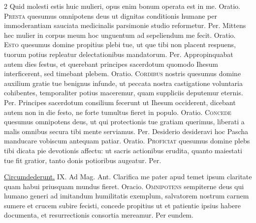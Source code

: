 \begin{multicols*}{2}
 Quid molesti estis huic mulieri, opus enim bonum operata est in me. {\color{Red} Oratio.}
\lettrine[lines=2]{\zallmancaps \color{Red} P}{resta} quesumus omnipotens deus ut dignitas conditionis humane per immoderantiam sauciata medicinalis parsimonie studio reformetur. Per.
 Mittens hec mulier in corpus meum hoc unguentum ad sepeliendum me fecit. {\color{Red} Oratio.}
\lettrine[lines=2]{\zallmancaps \color{Blue} E}{sto} quesumus domine propitius plebi tue, ut que tibi non placent respuens, tuorum potius repleatur delectationibus mandatorum. Per.
 Appropinquabat autem dies festus, et querebant principes sacerdotum quomodo Ihesum interficerent, sed timebant plebem. {\color{Red} Oratio.}
\lettrine[lines=2]{\zallmancaps \color{Red} C}{ordibus} nostris quesumus domine auxilium gratie tue benignus infunde, ut peccata nostra castigatione voluntaria cohibentes, temporaliter potius maceremur, quam suppliciis deputemur eternis. Per.
 Principes sacerdotum consilium fecerunt ut Ihesum occiderent, dicebant autem non in die festo, ne forte tumultus fieret in populo. {\color{Red} Oratio.}
\lettrine[lines=2]{\zallmancaps \color{Blue} C}{oncede} quesumus omnipotens deus, ut qui protectionis tue gratiam querimus, liberati a malis omnibus secura tibi mente serviamus. Per.
 Desiderio desideravi hoc Pascha manducare vobiscum antequam patiar. {\color{Red} Oratio.}
\lettrine[lines=2]{\zallmancaps \color{Red} P}{roficiat} quesumus domine plebs tibi dicata pie devotionis affectu: ut sacris actionibus erudita, quanto maiestati tue fit gratior, tanto donis potioribus augeatur. Per.
{\color{Red} }
\par {} \R \hyperlink{circumdederunt-me-viri}{Circumdederunt.} {\color{Red} IX. Ad Mag. Ant.} Clarifica me pater apud temet ipsum claritate quam habui priusquam mundus fieret. {\color{Red} Oracio.}
\lettrine[lines=2]{\zallmancaps \color{Blue} O}{mnipotens} sempiterne deus qui humano generi ad imitandum humilitatis exemplum, salvatorem nostrum carnem sumere et crucem subire fecisti, concede propitius ut et patientie ipsius habere documenta, et resurrectionis consortia mereamur. Per eundem.

\end{multicols*}
